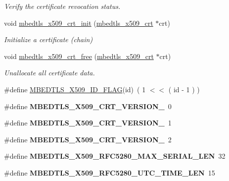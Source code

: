 \begin{DoxyCompactItemize}
\begin{DoxyCompactList}\small\item\em Verify the certificate revocation status. \end{DoxyCompactList}\item 
void \hyperlink{group__x509__module_ga016dd06bc770e77b84005f305df20ed1}{mbedtls\-\_\-x509\-\_\-crt\-\_\-init} (\hyperlink{structmbedtls__x509__crt}{mbedtls\-\_\-x509\-\_\-crt} $\ast$crt)
\begin{DoxyCompactList}\small\item\em Initialize a certificate (chain) \end{DoxyCompactList}\item 
void \hyperlink{group__x509__module_gab33c1e4e20bea7ce536119f54a113c6b}{mbedtls\-\_\-x509\-\_\-crt\-\_\-free} (\hyperlink{structmbedtls__x509__crt}{mbedtls\-\_\-x509\-\_\-crt} $\ast$crt)
\begin{DoxyCompactList}\small\item\em Unallocate all certificate data. \end{DoxyCompactList}\item 
\#define \hyperlink{group__x509__module_gaedcb73f1c615c266a348a0c62763c5de}{M\-B\-E\-D\-T\-L\-S\-\_\-\-X509\-\_\-\-I\-D\-\_\-\-F\-L\-A\-G}(id)~( 1 $<$$<$ ( id -\/ 1 ) )
\item 
\hypertarget{group__x509__module_ga8d124765addc200627de55f2018b1ed3}{\#define {\bfseries M\-B\-E\-D\-T\-L\-S\-\_\-\-X509\-\_\-\-C\-R\-T\-\_\-\-V\-E\-R\-S\-I\-O\-N\-\_}~0}\label{group__x509__module_ga8d124765addc200627de55f2018b1ed3}

\item 
\hypertarget{group__x509__module_ga46a0b7f3a4c1f279f609fd8ea304c192}{\#define {\bfseries M\-B\-E\-D\-T\-L\-S\-\_\-\-X509\-\_\-\-C\-R\-T\-\_\-\-V\-E\-R\-S\-I\-O\-N\-\_}~1}\label{group__x509__module_ga46a0b7f3a4c1f279f609fd8ea304c192}

\item 
\hypertarget{group__x509__module_ga7c22a610222ea94e1faf96223bc5d9a4}{\#define {\bfseries M\-B\-E\-D\-T\-L\-S\-\_\-\-X509\-\_\-\-C\-R\-T\-\_\-\-V\-E\-R\-S\-I\-O\-N\-\_}~2}\label{group__x509__module_ga7c22a610222ea94e1faf96223bc5d9a4}

\item 
\hypertarget{group__x509__module_ga189113155d9c64d4b4255b16761377c7}{\#define {\bfseries M\-B\-E\-D\-T\-L\-S\-\_\-\-X509\-\_\-\-R\-F\-C5280\-\_\-\-M\-A\-X\-\_\-\-S\-E\-R\-I\-A\-L\-\_\-\-L\-E\-N}~32}\label{group__x509__module_ga189113155d9c64d4b4255b16761377c7}

\item 
\hypertarget{group__x509__module_ga533580091501768fa25d4d682febbb08}{\#define {\bfseries M\-B\-E\-D\-T\-L\-S\-\_\-\-X509\-\_\-\-R\-F\-C5280\-\_\-\-U\-T\-C\-\_\-\-T\-I\-M\-E\-\_\-\-L\-E\-N}~15}\label{group__x509__module_ga533580091501768fa25d4d682febbb08}

\end{DoxyCompactItemize}
